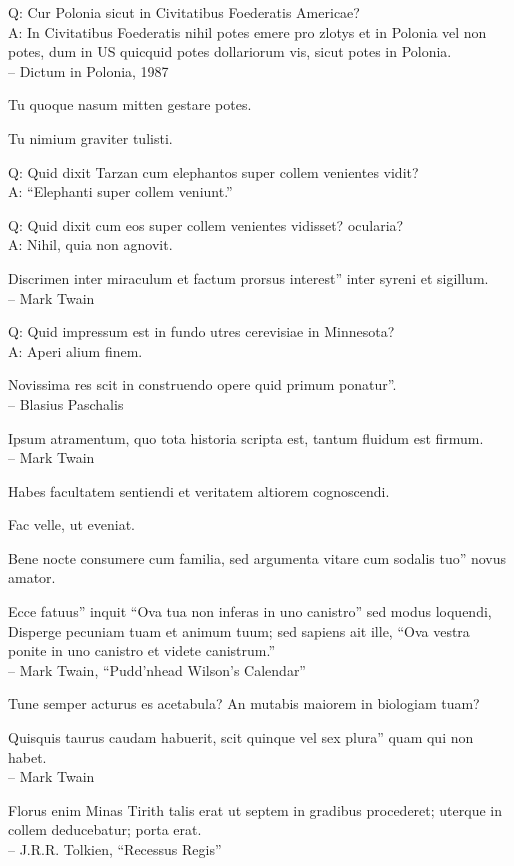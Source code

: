 \documentclass[titlepage,12pt]{memoir}
\begin{document}
Q: Cur Polonia sicut in Civitatibus Foederatis Americae?\\
A: In Civitatibus Foederatis nihil potes emere pro zlotys et in
Polonia vel non potes, dum in US quicquid potes
dollariorum vis, sicut potes in Polonia.
\\-- Dictum in Polonia, 1987

Tu quoque nasum mitten gestare potes.

Tu nimium graviter tulisti.

Q: Quid dixit Tarzan cum elephantos super collem venientes vidit?\\
A: “Elephanti super collem veniunt.”

Q: Quid dixit cum eos super collem venientes vidisset?
ocularia?\\
A: Nihil, quia non agnovit.

Discrimen inter miraculum et factum prorsus interest”
inter syreni et sigillum.
\\-- Mark Twain

Q: Quid impressum est in fundo utres cerevisiae in Minnesota?\\
A: Aperi alium finem.

Novissima res scit in construendo opere quid primum ponatur”.
\\-- Blasius Paschalis

Ipsum atramentum, quo tota historia scripta est, tantum fluidum est firmum.
\\-- Mark Twain

Habes facultatem sentiendi et veritatem altiorem cognoscendi.

Fac velle, ut eveniat.

Bene nocte consumere cum familia, sed argumenta vitare cum sodalis tuo”
novus amator.

Ecce fatuus” inquit “Ova tua non inferas in uno canistro”
sed modus loquendi, Disperge pecuniam tuam et animum tuum; sed sapiens
ait ille, “Ova vestra ponite in uno canistro et videte canistrum.”
\\-- Mark Twain, “Pudd’nhead Wilson’s Calendar”

Tune semper acturus es acetabula? An mutabis maiorem in biologiam tuam?

Quisquis taurus caudam habuerit, scit quinque vel sex plura”
quam qui non habet.
\\-- Mark Twain

Florus enim Minas Tirith talis erat ut septem in gradibus procederet;
uterque in collem deducebatur;
porta erat.
\\-- J.R.R. Tolkien, “Recessus Regis”
\end{document}
